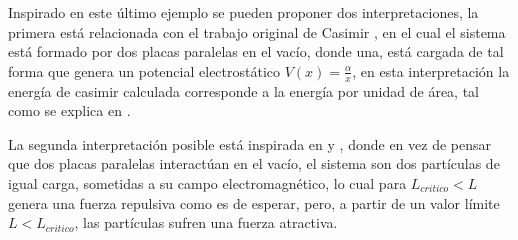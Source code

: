 Inspirado en este último ejemplo se pueden proponer dos interpretaciones, la primera está relacionada con el trabajo original de Casimir \cite{Casimir:1948dh}, en el cual el sistema está formado por dos placas paralelas en el vacío, donde una, está cargada de tal forma que genera un potencial electrostático $V (x) = \frac{\alpha}{x}$, en esta interpretación la energía de casimir calculada corresponde a la energía por unidad de área, tal como se explica en \cite{Blau_1988}.

La segunda interpretación posible está inspirada en \cite{MILTON198049} y \cite{Beauregard_2013}, donde en vez de pensar que dos placas paralelas interactúan en el vacío, el sistema son dos partículas de igual carga, sometidas a su campo electromagnético, lo cual para $L _{critico} < L$ genera una fuerza repulsiva como es de esperar, pero, a partir de un valor límite $L < L _{critico}$, las partículas sufren una fuerza atractiva.









